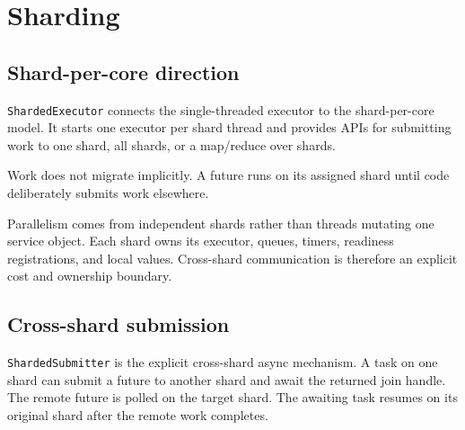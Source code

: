\chapter{Sharding}
\label{chap:sharding}

\section{Shard-per-core direction}

\texttt{ShardedExecutor} connects the single-threaded executor to the
shard-per-core model. It starts one executor per shard thread and provides APIs
for submitting work to one shard, all shards, or a map/reduce over shards.

Work does not migrate implicitly. A future runs on its assigned shard until
code deliberately submits work elsewhere.

Parallelism comes from independent shards rather than threads mutating one
service object. Each shard owns its executor, queues, timers, readiness
registrations, and local values. Cross-shard communication is therefore an
explicit cost and ownership boundary.

\begin{center}
\end{center}

\section{Cross-shard submission}

\texttt{ShardedSubmitter} is the explicit cross-shard async mechanism. A task
on one shard can submit a future to another shard and await the returned join
handle. The remote future is polled on the target shard. The awaiting task
resumes on its original shard after the remote work completes.


